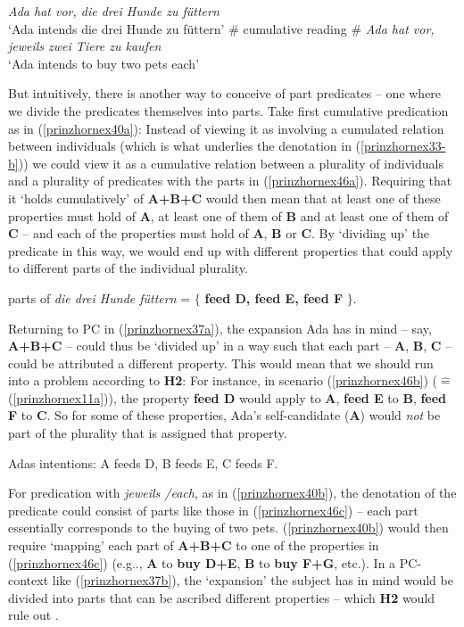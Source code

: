 \documentclass[output=paper,colorlinks,citecolor=brown,
]{langscibook}
\begin{document}
\ea  \label{prinzhornpc}
\ea  \textit{Ada hat vor, die drei Hunde zu f\"{u}ttern}\\
	`Ada intends die drei Hunde zu f\"{u}ttern' \phantom{.}\hfill $\#$ cumulative reading\label{prinzhornex37a}
	\ex $\#$ \textit{Ada hat vor, jeweils zwei Tiere zu kaufen}\\
	`Ada intends to buy two pets each' \label{prinzhornex37b}
	\z\z

But intuitively, there is another way  to conceive of part predicates -- one where we divide the predicates themselves into parts. Take first cumulative predication as in (\ref{prinzhornex40a}): Instead of viewing it as involving a cumulated relation between individuals (which is what underlies the denotation in (\ref{prinzhornex33-b})) we could view it as a cumulative relation between a plurality of individuals and a plurality of predicates with the parts in  (\ref{prinzhornex46a}). Requiring that it `holds cumulatively' of \textbf{A+B+C} would then mean that at least one of these properties must hold of \textbf{A}, at least one of them  of \textbf{B} and at least one of them of \textbf{C} -- and each of the properties must hold of \textbf{A}, \textbf{B} or \textbf{C}. By `dividing up' the predicate in this way, we would  end up with different properties that could apply to different parts of the individual plurality.

\ea  parts of \textit{die drei Hunde f\"{u}ttern} = $\{$ \textbf{feed D, feed E, feed F} $\}$.\label{prinzhornex46a}
\z

Returning to PC in (\ref{prinzhornex37a}), the expansion Ada has in mind -- say, {\bf A+B+C} -- could thus be `divided up' in a way such that each part -- {\bf A}, {\bf B}, {\bf C} -- could be attributed a different property. This would mean that we should run into a problem according to {\bf H2}: For instance, in scenario (\ref{prinzhornex46b}) ($\widehat{=}$ (\ref{prinzhornex11a})), the property {\bf feed D} would apply to \textbf{A},  {\bf feed E} to \textbf{B}, \textbf{feed F} to \textbf{C}. So for some of these properties, Ada's self-candidate (\textbf{A}) would \textit{not}  be part of the plurality that is assigned that property.

 Adas intentions: A feeds D, B feeds E, C feeds F. \label{prinzhornex46b} \z

For predication with \textit{jeweils /each}, as in (\ref{prinzhornex40b}), the denotation of  the predicate could consist of parts like those in (\ref{prinzhornex46c}) -- each part essentially corresponds to the buying of two pets. (\ref{prinzhornex40b}) would then require `mapping' each part of \textbf{A+B+C} to one of the properties in (\ref{prinzhornex46c}) (e.g.., \textbf{A} to \textbf{buy D+E}, \textbf{B} to \textbf{buy F+G}, etc.). In a PC-context like (\ref{prinzhornex37b}),  the `expansion' the subject has in mind would be divided into parts that can be ascribed different properties -- which {\bf H2} would rule out .
\end{document}
